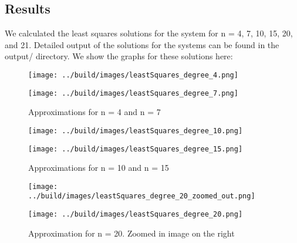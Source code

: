 \documentclass[11pt, a4paper, titlepage, openright]{article}
\begin{document}
\subsection{Results}
    We calculated the least squares solutions for the system for n = 4, 7, 10, 15, 20, and 21. Detailed output of the solutions for the systems can be found in the output/ directory.
    We show the graphs for these solutions here:
    \begin{figure}[H]
        \begin{minipage}[b]{0.49\textwidth}
            \texttt{[image: ../build/images/leastSquares\_degree\_4.png]}
        \end{minipage}
        \hfill
        \begin{minipage}[b]{0.49\textwidth}
            \texttt{[image: ../build/images/leastSquares\_degree\_7.png]}
        \end{minipage}
        \caption{Approximations for n = 4 and n = 7}
        \label{fig:results1}
    \end{figure}
    \begin{figure}[H]
        \begin{minipage}[b]{0.49\textwidth}
            \texttt{[image: ../build/images/leastSquares\_degree\_10.png]}
        \end{minipage}
        \hfill
        \begin{minipage}[b]{0.49\textwidth}
            \texttt{[image: ../build/images/leastSquares\_degree\_15.png]}
        \end{minipage}
       \caption{Approximations for n = 10 and n = 15}
        \label{fig:results2}
    \end{figure}
    \begin{figure}[H]
        \begin{minipage}[b]{0.49\textwidth}
            \texttt{[image: ../build/images/leastSquares\_degree\_20\_zoomed\_out.png]}
        \end{minipage}
        \hfill
        \begin{minipage}[b]{0.49\textwidth}
            \texttt{[image: ../build/images/leastSquares\_degree\_20.png]}
        \end{minipage}
        \caption{Approximation for n = 20. Zoomed in image on the right}
        \label{fig:results3}
    \end{figure}
\end{document}
